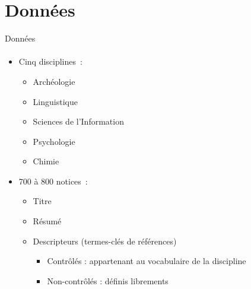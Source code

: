 \section{Données}
  \begin{frame}{Données}
    \framesubtitle{}

    \begin{itemize}
      \item{Cinq disciplines~:}
      \begin{itemize}
        \item{Archéologie}
        \item{Linguistique}
        \item{Sciences de l'Information}
        \item{Psychologie}
        \item{Chimie}
      \end{itemize}
      \item<2->{700 à 800 notices~:}
      \begin{itemize}
        \item{Titre}
        \item{Résumé}
        \item{Descripteurs (termes-clés de références)}
        \begin{itemize}
          \item{Contrôlés : appartenant au vocabulaire de la discipline}
          \item{Non-contrôlés : définis librements}
        \end{itemize}
      \end{itemize}
    \end{itemize}
  \end{frame}

